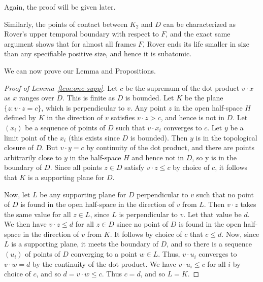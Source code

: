 Again, the proof will be given later.

Similarly, the points of contact between $K_2$ and $D$ can be characterized as Rover's upper temporal boundary with respect to $F$, and the exact same argument shows that for almost all frames $F$, Rover ends its life smaller in size than any specifiable positive size, and hence it is subatomic.

We can now prove our Lemma and Propositions.

\begin{proof}[Proof of Lemma~\ref{lem:one-supp}]
Let $c$ be the supremum of the dot product $v\cdot x$ as $x$ ranges over $D$. This is finite as $D$ is bounded. Let 
$K$ be the plane $\{ z : v\cdot z = c \}$, which is perpendicular to $v$. Any point $z$ in the open half-space $H$ defined by $K$ in the direction of $v$ satisfies $v\cdot z > c$, and hence is not in $D$. Let $(x_i)$ be a sequence of points of $D$ such that $v\cdot x_i$ converges to $c$. Let $y$ be a limit point of the $x_i$ (this exists since $D$ is bounded). Then $y$ is in the topological closure of $D$. But $v\cdot y = c$ by continuity of the dot product, and there are points arbitrarily close to $y$ in the half-space $H$ and hence not in $D$, so y is in the boundary of $D$. Since all points $z\in D$ satisfy $v\cdot z \le c$ by choice of $c$, it follows that $K$ is a supporting plane for $D$.
 
Now, let $L$ be any supporting plane for $D$ perpendicular to $v$ such that no point of $D$ is found in the open half-space in the direction of $v$ from $L$. Then $v\cdot z$ takes the same value for all $z \in L$, since $L$ is perpendicular to $v$. Let that value be $d$. We then have $v\cdot z \le d$ for all $z\in D$ since no point of $D$ is found in the open half-space in the direction of $v$ from $K$. It follows by choice of $c$ that $c \le d$. Now, since $L$ is a supporting plane, it meets the boundary of $D$, and so there is a sequence $(u_i)$ of points of $D$ converging to a point $w\in L$. Thus, $v\cdot u_i$ converges to $v\cdot w = d$ by  the continuity of the dot product. We have $v\cdot u_i \le c$ for all $i$ by choice of $c$, and so $d = v\cdot w \le c$.
Thus $c = d$, and so $L = K$.
\end{proof}


